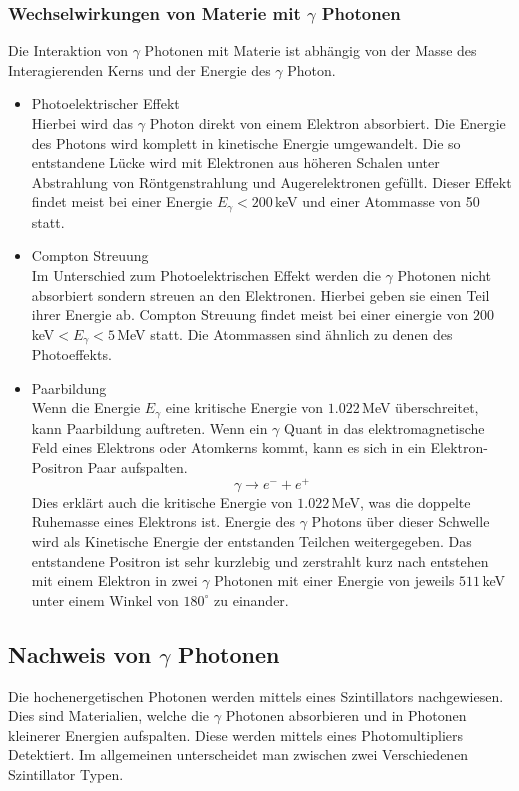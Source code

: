 \subsubsection{Wechselwirkungen von Materie mit $\gamma$ Photonen}
Die Interaktion von $\gamma$ Photonen mit Materie ist abhängig von der Masse des Interagierenden Kerns und der Energie des $\gamma$ Photon.
\begin{itemize}
	\item Photoelektrischer Effekt\\
	Hierbei wird das $\gamma$ Photon direkt von einem Elektron absorbiert. Die Energie des Photons wird komplett in kinetische Energie umgewandelt. Die so entstandene Lücke wird mit Elektronen aus höheren Schalen unter Abstrahlung von Röntgenstrahlung und Augerelektronen gefüllt. Dieser Effekt findet meist bei einer Energie $E_\gamma<200\,$keV und einer Atommasse von 50 statt.

	\item Compton Streuung\\
	Im Unterschied zum Photoelektrischen Effekt werden die $\gamma$ Photonen nicht absorbiert sondern streuen an den Elektronen. Hierbei geben sie einen Teil ihrer Energie ab.
	Compton Streuung findet meist bei einer einergie von $200\,$keV$<E_\gamma<5\,$MeV statt. Die Atommassen sind ähnlich zu denen des Photoeffekts.
	
	\item Paarbildung\\
	Wenn die Energie $E_\gamma$ eine kritische Energie von $1.022\,$MeV überschreitet, kann Paarbildung auftreten. Wenn ein $\gamma$ Quant in das elektromagnetische Feld eines Elektrons oder Atomkerns kommt, kann es sich in ein Elektron-Positron Paar aufspalten. 
		$$\gamma \rightarrow e^- + e^+$$
	Dies erklärt auch die kritische Energie von $1.022\,$MeV, was die doppelte Ruhemasse eines Elektrons ist. Energie des $\gamma$ Photons über dieser Schwelle wird als Kinetische Energie der entstanden Teilchen  weitergegeben. 
	Das entstandene Positron ist sehr kurzlebig und zerstrahlt kurz nach entstehen mit einem Elektron in zwei $\gamma$ Photonen mit einer Energie von jeweils $511\,$keV unter einem Winkel von $180^\circ$ zu einander. 
\end{itemize}

\subsection{Nachweis von $\gamma$ Photonen}
Die hochenergetischen Photonen werden mittels eines Szintillators nachgewiesen. Dies sind Materialien, welche die $\gamma$ Photonen absorbieren und in Photonen kleinerer Energien aufspalten. Diese werden mittels eines Photomultipliers Detektiert. 
Im allgemeinen unterscheidet man zwischen zwei Verschiedenen Szintillator Typen.
